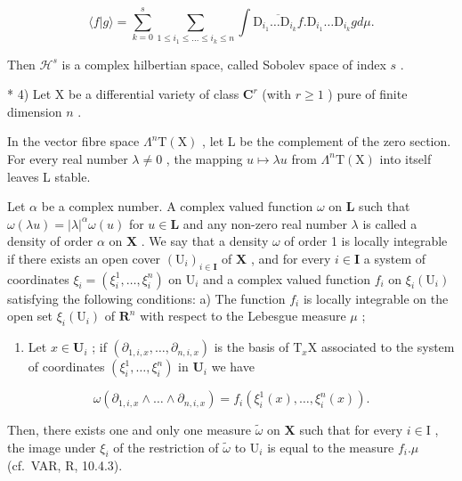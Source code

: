 \[
\langle f | g \rangle = \sum_ {k = 0} ^ {s} \sum_ {1 \leqslant i _ {1} \leqslant \dots \leqslant i _ {k} \leqslant n} \int \overline {{{{\mathrm{D} _ {i _ {1}} \dots \mathrm{D} _ {i _ {k}} f}}}}. \mathrm{D} _ {i _ {1}} \dots \mathrm{D} _ {i _ {k}} g d \mu .
\]

Then \(\mathcal{H}^s\) is a complex hilbertian space, called Sobolev space of index \(s\) .

* 4) Let X be a differential variety of class \(\mathbf{C}^r\) (with \(r \geqslant 1\) ) pure of finite dimension \(n\) .

In the vector fibre space \(\Lambda^{n}\mathrm{T}(\mathrm{X})\) , let L be the complement of the zero section. For every real number \(\lambda \neq 0\) , the mapping \(u \mapsto \lambda u\) from \(\Lambda^{n}\mathrm{T}(\mathrm{X})\) into itself leaves L stable.

Let \(\alpha\) be a complex number. A complex valued function \(\omega\) on \(\mathbf{L}\) such that \(\omega (\lambda u) = |\lambda |^{\alpha}\omega (u)\) for \(u\in \mathbf{L}\) and any non-zero real number \(\lambda\) is called a density of order \(\alpha\) on \(\mathbf{X}\) . We say that a density \(\omega\) of order 1 is locally integrable if there exists an open cover \((\mathrm{U}_i)_{i\in \mathbf{I}}\) of \(\mathbf{X}\) , and for every \(i\in \mathbf{I}\) a system of coordinates \(\xi_i = (\xi_i^1,\dots,\xi_i^n)\) on \(\mathrm{U}_i\) and a complex valued function \(f_{i}\) on \(\xi_i(\mathrm{U}_i)\) satisfying the following conditions: a) The function \(f_{i}\) is locally integrable on the open set \(\xi_i(\mathrm{U}_i)\) of \(\mathbf{R}^n\) with respect to the Lebesgue measure \(\mu\) ;

\begin{enumerate}
\def\labelenumi{\alph{enumi})}
\setcounter{enumi}{1}
\tightlist
\item
  Let \(x \in \mathbf{U}_i\) ; if \((\partial_{1,i,x}, \ldots, \partial_{n,i,x})\) is the basis of \(\mathrm{T}_x\mathrm{X}\) associated to the system of coordinates \((\xi_i^1, \ldots, \xi_i^n)\) in \(\mathbf{U}_i\) we have
\end{enumerate}

\[
\omega \left(\partial_ {1, i, x} \wedge \dots \wedge \partial_ {n, i, x}\right) = f _ {i} \left(\xi_ {i} ^ {1} (x), \dots , \xi_ {i} ^ {n} (x)\right).
\]

Then, there exists one and only one measure \(\tilde{\omega}\) on \(\mathbf{X}\) such that for every \(i\in \mathrm{I}\) , the image under \(\xi_{i}\) of the restriction of \(\tilde{\omega}\) to \(\mathrm{U}_i\) is equal to the measure \(f_{i}.\mu\) (cf.~VAR, R, 10.4.3).

